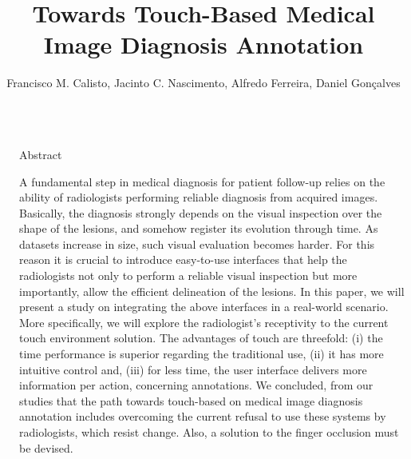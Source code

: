 \documentclass[final]{beamer}
\title{Towards Touch-Based Medical Image Diagnosis Annotation} %
\author{Francisco M. Calisto, Jacinto C. Nascimento, Alfredo Ferreira, Daniel Gon\c{c}alves} %
\institute{Institute for Systems and Robotics (ISR/IST), LARSyS, INESC-ID, Instituto Superior T\'{e}cnico, Universidade de Lisboa} %
\newlength{\sepmargin}
\newlength{\onecolwid}
\begin{document}
\setlength{\belowcaptionskip}{2ex} %
\setlength\belowdisplayshortskip{1ex} %


\begin{frame}[t] %

\begin{columns}[t] %

\begin{column}{\sepmargin}\end{column}

\begin{column}{\onecolwid} %


\begin{block}{Abstract}

A fundamental step in medical diagnosis for patient follow-up relies on the ability of radiologists performing reliable diagnosis from acquired images. Basically, the diagnosis strongly depends on the visual inspection over the shape of the lesions, and somehow register its evolution through time. As datasets increase in size, such visual evaluation becomes harder. For this reason it is crucial to introduce easy-to-use interfaces that help the radiologists not only to perform a reliable visual inspection but more importantly, allow the efficient delineation of the lesions. In this paper, we will present a study on integrating the above interfaces in a real-world scenario. More specifically, we will explore the radiologist's receptivity to the current touch environment solution. The advantages of touch are threefold: (i) the time performance is superior regarding the traditional use, (ii) it has more intuitive control and, (iii) for less time, the user interface delivers more information per action, concerning annotations. We concluded, from our studies that the path towards touch-based on medical image diagnosis annotation includes overcoming the current refusal to use these systems by radiologists, which resist change. Also, a solution to the finger occlusion must be devised.

\end{block}


\end{column}
\end{columns}
\end{frame}
\end{document}
